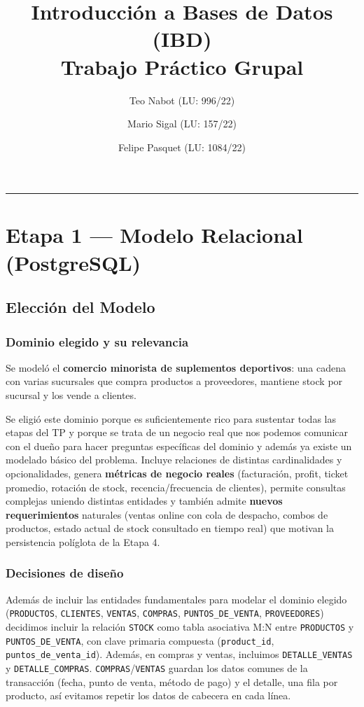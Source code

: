 \documentclass[11pt,a4paper]{article}
\title{\vspace{-1.5cm}\textbf{Introducción a Bases de Datos (IBD)}\\[0.4em]
       \Large Trabajo Práctico Grupal}
\author{Teo Nabot (LU: 996/22) \and Mario Sigal (LU: 157/22) \and Felipe Pasquet (LU: 1084/22)}
\date{}
\begin{document}
\maketitle
\thispagestyle{empty}

\tableofcontents
\vspace{1em}
\hrule
\vspace{1em}

\section{Etapa 1 — Modelo Relacional (PostgreSQL)}

\subsection{Elección del Modelo}

\subsubsection*{Dominio elegido y su relevancia}

Se modeló el \textbf{comercio minorista de suplementos deportivos}: una cadena con
varias sucursales que compra productos a proveedores, mantiene stock por sucursal y
los vende a clientes.

Se eligió este dominio porque es suficientemente rico para sustentar todas las etapas
del TP y porque se trata de un negocio real que nos podemos comunicar con el dueño para
hacer preguntas específicas del dominio y además ya existe un modelado básico del
problema. Incluye relaciones de distintas cardinalidades y opcionalidades, genera
\textbf{métricas de negocio reales} (facturación, profit, ticket promedio, rotación de
stock, recencia/frecuencia de clientes), permite consultas complejas uniendo distintas
entidades y también admite \textbf{nuevos requerimientos} naturales (ventas online con
cola de despacho, combos de productos, estado actual de stock consultado en tiempo real)
que motivan la persistencia políglota de la Etapa 4.

\subsubsection*{Decisiones de diseño}

Además de incluir las entidades fundamentales para modelar el dominio elegido
(\texttt{PRODUCTOS}, \texttt{CLIENTES}, \texttt{VENTAS}, \texttt{COMPRAS},
\texttt{PUNTOS\_DE\_VENTA}, \texttt{PROVEEDORES}) decidimos incluir la relación
\texttt{STOCK} como tabla asociativa M:N entre \texttt{PRODUCTOS} y
\texttt{PUNTOS\_DE\_VENTA}, con clave primaria compuesta
(\texttt{product\_id}, \texttt{puntos\_de\_venta\_id}). Además, en compras y ventas,
incluimos \texttt{DETALLE\_VENTAS} y \texttt{DETALLE\_COMPRAS}.
\texttt{COMPRAS}/\texttt{VENTAS} guardan los datos comunes de la transacción (fecha,
punto de venta, método de pago) y el detalle, una fila por producto, así evitamos
repetir los datos de cabecera en cada línea.
\end{document}
